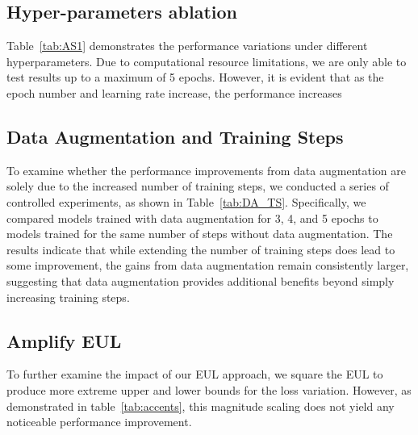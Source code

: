 \documentclass[11pt]{article}
\begin{document}
\subsection{Hyper-parameters ablation}  

Table~\ref{tab:AS1} demonstrates the performance variations under different hyperparameters. Due to computational resource limitations, we are only able to test results up to a maximum of 5 epochs. However, it is evident that as the epoch number and learning rate increase, the performance increases

\subsection{Data Augmentation and Training Steps}

To examine whether the performance improvements from data augmentation are solely due to the increased number of training steps, we conducted a series of controlled experiments, as shown in Table~\ref{tab:DA_TS}. Specifically, we compared models trained with data augmentation for 3, 4, and 5 epochs to models trained for the same number of steps without data augmentation. The results indicate that while extending the number of training steps does lead to some improvement, the gains from data augmentation remain consistently larger, suggesting that data augmentation provides additional benefits beyond simply increasing training steps.




\subsection{Amplify EUL} 
To further examine the impact of our EUL approach, we square the EUL to produce more extreme upper and lower bounds for the loss variation. However, as demonstrated in table~\ref{tab:accents}, this magnitude scaling does not yield any noticeable performance improvement.
\end{document}
